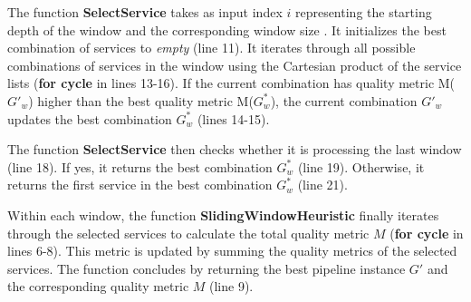 The function \textbf{SelectService} takes as input index $i$ representing the starting depth of the window and the corresponding window size \windowsize. It initializes the best combination of services to \textit{empty} (line 11). It iterates through all possible combinations of services in the window using the Cartesian product of the service lists (\textbf{for cycle} in lines 13-16). If the current combination has quality metric M($G'_w$) higher than the best quality metric M($G^*_w$), the current combination $G'_w$ updates the best combination $G^*_w$ (lines 14-15).

The function \textbf{SelectService} then checks whether it is processing the last window (line 18). If yes, it returns the best combination $G^*_w$ (line 19). Otherwise, it returns the first service in the best combination $G^*_w$ (line 21).

Within each window, the function \textbf{SlidingWindowHeuristic} finally iterates through the selected services to calculate the total quality metric $M$ (\textbf{for cycle} in lines 6-8). This metric is updated by summing the quality metrics of the selected services. The function concludes by returning the best pipeline instance $G'$ and the corresponding quality metric $M$ (line 9).